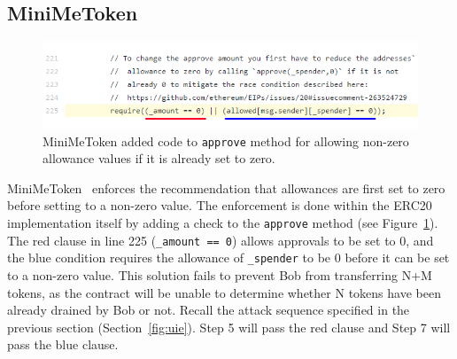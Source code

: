 
\subsection{MiniMeToken}
\label{sec:MiniMeToken}


\begin{figure}[t]
	\centering
	\includegraphics[width=1.0\linewidth]{figures/multiple_withdrawal_06.png}
	\caption{MiniMeToken added code to \texttt{approve} method for allowing non-zero allowance values if it is already set to zero.\label{fig:mini}}
\end{figure}

MiniMeToken~\cite{Ref15} enforces the recommendation that allowances are first set to zero before setting to a non-zero value. The enforcement is done within the ERC20 implementation itself by adding a check to the \texttt{approve} method (see Figure~\ref{fig:mini}). The red clause in line 225 (\texttt{\_amount == 0}) allows approvals to be set to 0, and the blue condition requires the allowance of \texttt{\_spender} to be 0 before it can be set to a non-zero value. This solution fails to prevent Bob from transferring N+M tokens, as the contract will be unable to determine whether N tokens have been already drained by Bob or not. Recall the attack sequence specified in the previous section (Section~\ref{fig:uie}). Step 5 will pass the red clause and Step 7 will pass the blue clause.



